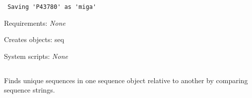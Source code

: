 \begin{description}
\begin{enumerate}
\begin{verbatim}
 Saving 'P43780' as 'miga'

\end{verbatim}

\end{enumerate}


\item{Requirements:} {\em None}


\item{Creates objects:} seq


\item{System scripts:} {\em None}

\end{description}



\subsection[seq\_unique]{  }



Finds unique sequences in one sequence object relative to another
by comparing sequence strings.


